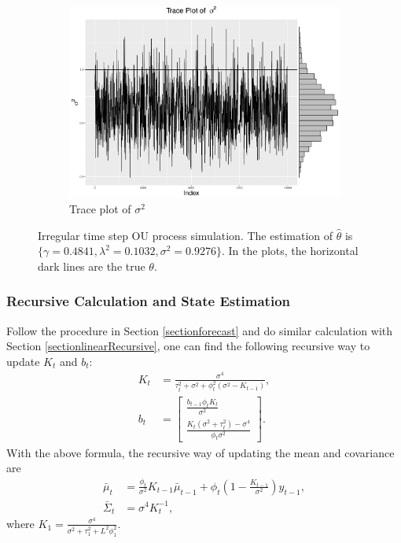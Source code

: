 \begin{figure}[h]
\begin{subfigure}[b]{0.3\textwidth}
    \includegraphics[width=\textwidth]{Chapters/05MCMCOU/plots/simudataOUtracesig2.pdf}
     \caption{Trace plot of $\sigma^2$}
\end{subfigure}
\caption{Irregular time step OU process simulation. The estimation of $\hat{\theta}$ is $\{\gamma=0.4841, \lambda^2=0.1032, \sigma^2=0.9276\}$. In the plots, the horizontal dark lines are the true $\theta$. }
\label{simuOUmarginplots}
\end{figure}



\subsubsection*{Recursive Calculation and State Estimation}

Follow the procedure in Section \ref{sectionforecast} and do similar calculation with Section \ref{sectionlinearRecursive}, one can find the following recursive way to update $K_{t}$ and $b_{t}$: 
\begin{align} \label{linearOUK}
K_{t}  &=\frac{\sigma^4}{\tau_t^2+\sigma^2+\phi_t^2(\sigma^2-K_{t-1})},\\
b_{t} &= \begin{bmatrix}
\frac{b_{t-1}\phi_t K_{t}}{\sigma^2} \\ \frac{K_{t}(\sigma^2+\tau_t^2)-\sigma^4 }{\phi_t\sigma^2}
\end{bmatrix}. 
\end{align}
With the above formula, the recursive way of updating the mean and covariance are 
\begin{align} \label{linearOUmu}
\bar{\mu}_{t}       & = \frac{\phi_t}{\sigma^2}K_{t-1}\bar{\mu}_{t-1} + \phi_t \left(1 - \frac{K_{t-1}}{\sigma^2}\right)y_{t-1}, \\
\bar{\Sigma}_{t}  &= \sigma^4K_{t}^{-1}, \label{linearOUsigma}
\end{align}
where $K_1=\frac{\sigma^4}{\sigma^2+\tau_1^2+L^2\phi_1^2}$. 

